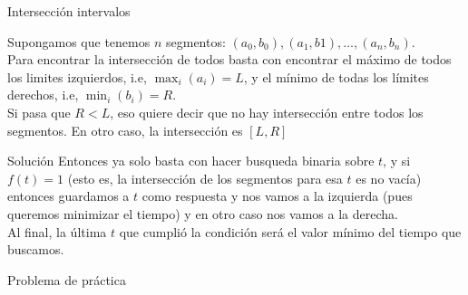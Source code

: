 \begin{frame}{Intersección intervalos}

	Supongamos que tenemos $n$ segmentos: $(a_{0}, b_{0}), (a_{1}, b{1}), \dots, (a_{n}, b_{n})$. \\

	Para encontrar la intersección de todos basta con encontrar el máximo de todos los limites izquierdos, i.e, $\max_{i}(a_{i}) = L$, y el mínimo de todas los límites derechos, i.e, $\min_i(b_{i})= R$.  \\

	Si pasa que $R < L$, eso quiere decir que no hay intersección entre todos los segmentos. En otro caso, la intersección es $[L, R]$
\end{frame}

\begin{frame}{Solución}
	Entonces ya solo basta con hacer busqueda binaria sobre $t$, y si $f(t) = 1$ (esto es, la intersección de los segmentos para esa $t$ es no vacía) entonces guardamos a $t$ como respuesta y nos vamos a la izquierda (pues queremos minimizar el tiempo) y en otro caso nos vamos a la derecha. \\

	Al final, la última $t$ que cumplió la condición será el valor mínimo del tiempo que buscamos.
\end{frame}


\begin{frame}{Problema de práctica}
	\begin{itemize}
	\end{itemize}
\end{frame}
